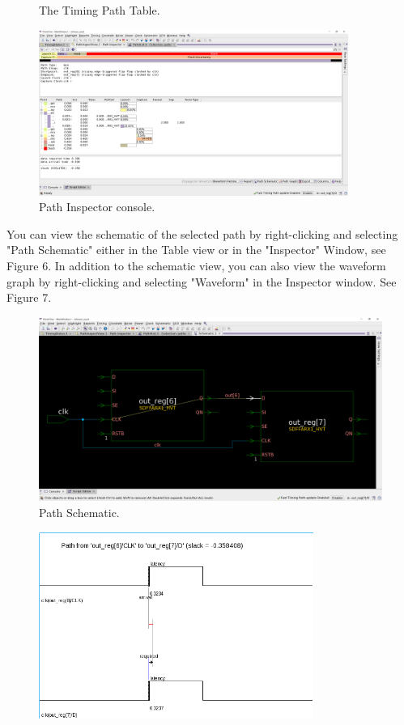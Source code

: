 \documentclass[a4paper,12pt,twoside]{article}
\begin{document}
\begin{enumerate}
\begin{enumerate}
\begin{figure}[H]
            \caption{The Timing Path Table.}
            \label{f35}
        \end{figure}
        \begin{figure}[H]
            \centering
            \includegraphics[width=0.9\textwidth]{images/36.png}
            \caption{Path Inspector console.}
            \label{f36}
        \end{figure}
        You can view the schematic of the selected path by right-clicking and selecting "Path Schematic" either in the Table view or in the "Inspector" Window, see Figure 6. In addition to the schematic view, you can also view the waveform graph by right-clicking and selecting "Waveform" in the Inspector window. See Figure 7.
        \begin{figure}[H]
            \centering
            \includegraphics[width=\textwidth]{images/37.png}
            \caption{Path Schematic.}
            \label{f37}
        \end{figure}
        \begin{figure}[H]
            \centering
            \includegraphics[width=0.8\textwidth]{images/38.png}

\end{figure}
\end{enumerate}
\end{enumerate}
\end{document}
